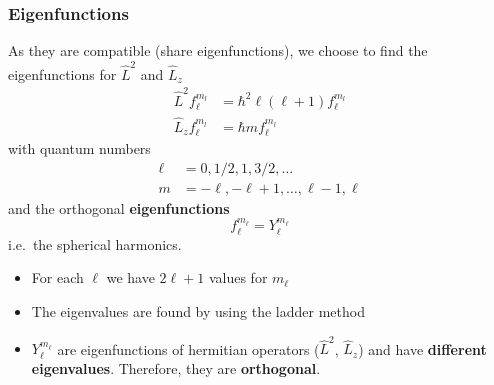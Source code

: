 \subsubsection{Eigenfunctions}

As they are compatible (share eigenfunctions), we choose to find the eigenfunctions for $\widehat{L}^2$ and $\widehat{L}_z$
\begin{align*}
    \widehat{L}^2 f_{\ell}^{m_l} & =\hbar^{2}\ell (\ell+1) f_{\ell}^{m_l} \\
    \widehat{L}_z f_{\ell}^{m_l} & =\hbar mf_{\ell}^{m_l}
\end{align*}
with quantum numbers
\begin{align*}
    \ell & =0, 1/2, 1, 3/2,\ldots                \\
    m    & =-\ell, -\ell+1, \ldots, \ell-1, \ell
\end{align*}
and the orthogonal \textbf{eigenfunctions}
\begin{equation*}
    f_{\ell}^{m_\ell}=Y_{\ell}^{m_\ell}
\end{equation*}
i.e.\ the spherical harmonics.

\newpar{}
\begin{itemize}
    \item For each $\ell$ we have $2\ell+1$ values for $m_\ell$
    \item The eigenvalues are found by using the ladder method
    \item $Y_{\ell}^{m_\ell}$ are eigenfunctions of hermitian operators ($\widehat{L}^2$, $\widehat{L}_{z}$) and have \textbf{different eigenvalues}. Therefore, they are \textbf{orthogonal}.
\end{itemize}


